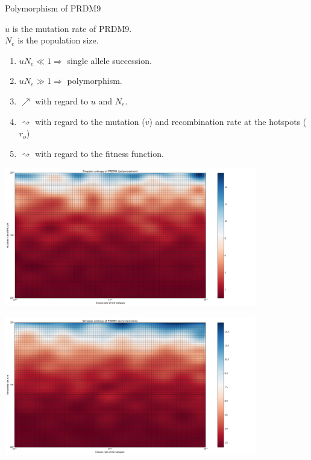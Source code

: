 \documentclass[10pt]{beamer}
\begin{document}
\begin{frame}
	\begin{center}
		\Large
    	Polymorphism of PRDM9
	\end{center}
	$ u $ is the mutation rate of PRDM9. \\
	$ N_e $ is the population size. \\ 
	\begin{enumerate}
		\item $u N_e \ll 1 \Rightarrow  $ single allele succession.
		\item $u N_e \gg 1 \Rightarrow  $ polymorphism.
		
		\item $\nearrow$ with regard to $u$ and $N_e$.
		
		\item $\rightsquigarrow$ with regard to the mutation ($v$) and recombination rate at the hotspots ($r_o$)
		
		\item $\rightsquigarrow$ with regard to the fitness function.
	\end{enumerate}
\end{frame}

\begin{frame}
	\begin{center}
       \includegraphics[width=11cm]{Images/simpson-entropy-mutation-erosion.png}
	\end{center}
\end{frame}


\begin{frame}
	\begin{center}
       \includegraphics[width=11cm]{Images/simpson-entropy-population-erosion.png}
	\end{center}
\end{frame}
\end{document}
